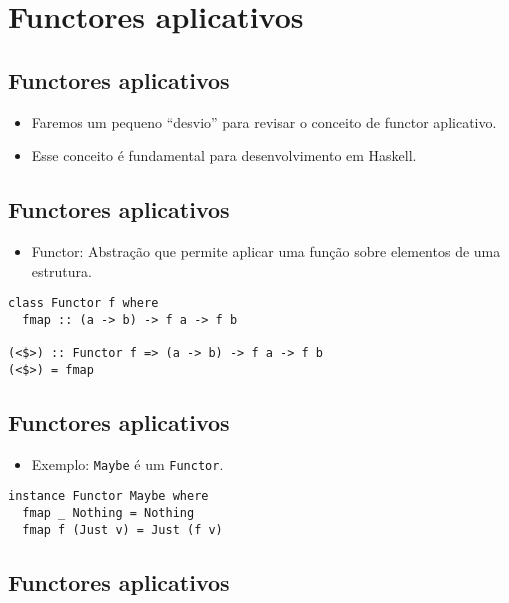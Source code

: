 \documentclass[11pt]{article}
\begin{document}
\section*{Functores aplicativos}
\label{sec:orgc13cd4b}

\subsection*{Functores aplicativos}
\label{sec:orgbcc0096}

\begin{itemize}
\item Faremos um pequeno ``desvio'' para revisar o conceito de functor aplicativo.

\item Esse conceito é fundamental para desenvolvimento em Haskell.
\end{itemize}
\subsection*{Functores aplicativos}
\label{sec:org027516d}

\begin{itemize}
\item Functor: Abstração que permite aplicar uma função sobre elementos de uma estrutura.
\end{itemize}

\begin{verbatim}
class Functor f where
  fmap :: (a -> b) -> f a -> f b

(<$>) :: Functor f => (a -> b) -> f a -> f b
(<$>) = fmap
\end{verbatim}
\subsection*{Functores aplicativos}
\label{sec:orgb8a44d5}

\begin{itemize}
\item Exemplo: \texttt{Maybe} é um \texttt{Functor}.
\end{itemize}

\begin{verbatim}
instance Functor Maybe where
  fmap _ Nothing = Nothing
  fmap f (Just v) = Just (f v)
\end{verbatim}
\subsection*{Functores aplicativos}
\label{sec:orgbb10dad}
\end{document}
